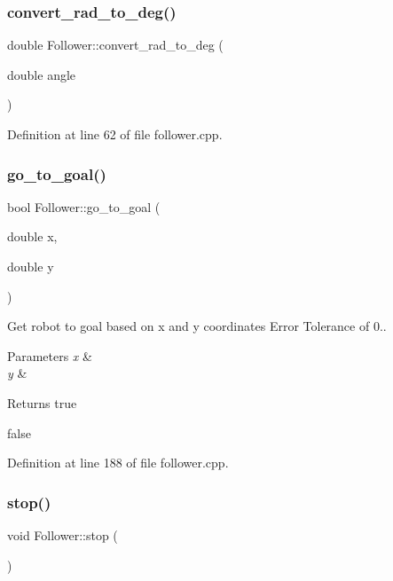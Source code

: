 \subsubsection{\texorpdfstring{convert\+\_\+rad\+\_\+to\+\_\+deg()}{convert\_rad\_to\_deg()}}
{\footnotesize\ttfamily double Follower\+::convert\+\_\+rad\+\_\+to\+\_\+deg (\begin{DoxyParamCaption}\item[{double}]{angle }\end{DoxyParamCaption})}



Definition at line 62 of file follower.\+cpp.

\mbox{\label{class_follower_a08ab05cb32f0e6653939163dd22f344a}} 
\subsubsection{\texorpdfstring{go\+\_\+to\+\_\+goal()}{go\_to\_goal()}}
{\footnotesize\ttfamily bool Follower\+::go\+\_\+to\+\_\+goal (\begin{DoxyParamCaption}\item[{double}]{x,  }\item[{double}]{y }\end{DoxyParamCaption})}



Get robot to goal based on x and y coordinates Error Tolerance of 0.. 


\begin{DoxyParams}{Parameters}
{\em x} & \\
\hline
{\em y} & \\
\hline
\end{DoxyParams}
\begin{DoxyReturn}{Returns}
true 

false 
\end{DoxyReturn}


Definition at line 188 of file follower.\+cpp.

\mbox{\label{class_follower_a84c17a75630c27bea4f401c8ab8e45b2}} 
\subsubsection{\texorpdfstring{stop()}{stop()}}
{\footnotesize\ttfamily void Follower\+::stop (\begin{DoxyParamCaption}{ }\end{DoxyParamCaption})}



